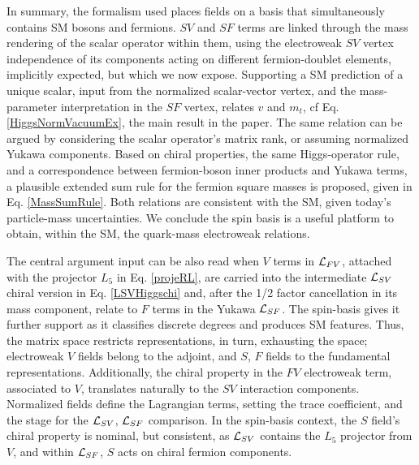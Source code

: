 \documentclass[12pt]{article}
\renewcommand\[{\begin{dmath}}
\renewcommand\]{\end{dmath}}
\begin{document}
In summary, the formalism used places fields on a   basis  that
simultaneously  contains  SM  bosons  and  fermions. $SV$ and $SF$ terms are linked through the mass rendering of the  scalar operator within them,
   using    the  electroweak $SV$ vertex   independence
of its components acting on different fermion-doublet elements,
  implicitly expected, but which we  now expose. Supporting  a
  SM prediction of a unique scalar,   input     from  the  normalized scalar-vector
vertex,  and  the  mass-parameter interpretation in  the   $SF$ vertex, relates $v$ and $m_t$, cf Eq. \ref{HiggsNormVacuumEx},  the main result in the paper.  The
  same relation can be argued  by considering the scalar operator's  matrix rank, or assuming normalized Yukawa components.
   Based on  chiral properties,  the same Higgs-operator rule,   and  a correspondence between    fermion-boson inner products and Yukawa terms,
       a plausible   extended sum rule   for the fermion square masses is proposed, given in  Eq. \ref{MassSumRule}. Both relations are consistent   with  the SM, given today's particle-mass uncertainties.
  We conclude the spin basis is a useful platform to obtain, within the SM, the quark-mass electroweak relations.


The  central argument input can be also read   when  $V$ terms
in   ${\cal L}_{FV}$, attached with the projector $L_5$ in Eq. \ref{projeRL},  are carried   into the intermediate    ${\cal L}_{SV}$  chiral   version in Eq. \ref{LSVHiggschi}     and,
 after the 1/2 factor cancellation in its mass component, relate  to  $F$ terms in the Yukawa ${\cal L}_{SF}$.
The    spin-basis   gives  it further support as it classifies discrete degrees and produces SM  features.
Thus,
 the matrix space restricts representations, in turn, exhausting the  space;
   electroweak $V$ fields  belong to the  adjoint, and $S$, $F$ fields to  the fundamental representations.
Additionally,
  the    chiral property    in  the   $FV$  electroweak term, associated to $V$,   translates naturally to the $SV$   interaction  components. Normalized  fields define
  the   Lagrangian terms, setting  the trace coefficient, and
 the stage for the ${\cal L}_{SV}$, ${\cal L}_{SF}$ comparison.
    In the spin-basis context, the    $S$ field's    chiral property is  nominal, but consistent, as
 ${\cal L}_{SV}$       contains  the $L_5$ projector from $V$,
and  within ${\cal L}_{SF}$,     $S$  acts on chiral fermion components.
\end{document}
